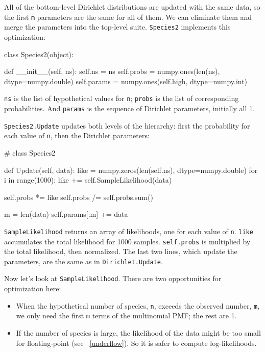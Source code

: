 \documentclass[12pt]{book}
\theoremstyle{exercise}
\begin{document}
All of the bottom-level Dirichlet distributions are updated
with the same data, so the first {\tt m} parameters are the same for
all of them.  
We can eliminate them and merge the parameters into
the top-level suite.  {\tt Species2} implements this optimization:

\begin{code}
class Species2(object):
    
    def __init__(self, ns):
        self.ns = ns
        self.probs = numpy.ones(len(ns), dtype=numpy.double)
        self.params = numpy.ones(self.high, dtype=numpy.int)
\end{code}

{\tt ns} is the list of hypothetical values for {\tt n};
{\tt probs} is the list of corresponding probabilities.  And
{\tt params} is the sequence of Dirichlet parameters, initially
all 1.

{\tt Species2.Update} updates both levels of
the hierarchy: first the probability for each value of {\tt n},
then the Dirichlet parameters:

\begin{code}
# class Species2

    def Update(self, data):
        like = numpy.zeros(len(self.ns), dtype=numpy.double)
        for i in range(1000):
            like += self.SampleLikelihood(data)

        self.probs *= like
        self.probs /= self.probs.sum()

        m = len(data)
        self.params[:m] += data
\end{code}

{\tt SampleLikelihood} returns an array of likelihoods, one for each
value of {\tt n}.  {\tt like} accumulates the total likelihood for
1000 samples.  {\tt self.probs} is multiplied by the total likelihood,
then normalized.  The last two lines, which update the parameters,
are the same as in {\tt Dirichlet.Update}.

Now let's look at {\tt SampleLikelihood}.  There are two
opportunities for optimization here:

\begin{itemize}

\item When the hypothetical number of species, {\tt n},
exceeds the observed number, {\tt m}, we only need the first {\tt m}
terms of the multinomial PMF; the rest are 1.

\item If the number of species is large, the likelihood of the data
  might be too small for floating-point (see ~\ref{underflow}).  So it
  is safer to compute log-likelihoods.
   

\end{itemize}
\end{document}
